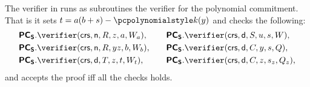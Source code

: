 \let\accentvec\vec \documentclass[runningheads,10pt]{llncs}
\begin{document}
	The verifier in \sonic{} runs as subroutines the verifier for the polynomial
	commitment. That is it sets $t = a(b + s) - \p{k}(y)$ and checks the following:
	\begin{equation*}
		\begin{split}
		&\PCOMs.\verifier(\crs, \multconstr, R, z, a, W_a), \\
		&\PCOMs.\verifier(\crs, \multconstr, R, yz, b, W_b),\\
		&\PCOMs.\verifier(\crs, \dconst, T, z, t, W_t),\\	
		\end{split}
		\qquad
		\begin{split}
		&\PCOMs.\verifier(\crs, \dconst, S, u, s, W),\\
		&\PCOMs.\verifier(\crs, \dconst, C, y, s, Q),\\
		&\PCOMs.\verifier(\crs, \dconst, C, z, s_z, Q_z),
		\end{split}
	\end{equation*}
	and accepts the proof iff all the checks holds.
	

	
\end{document}
